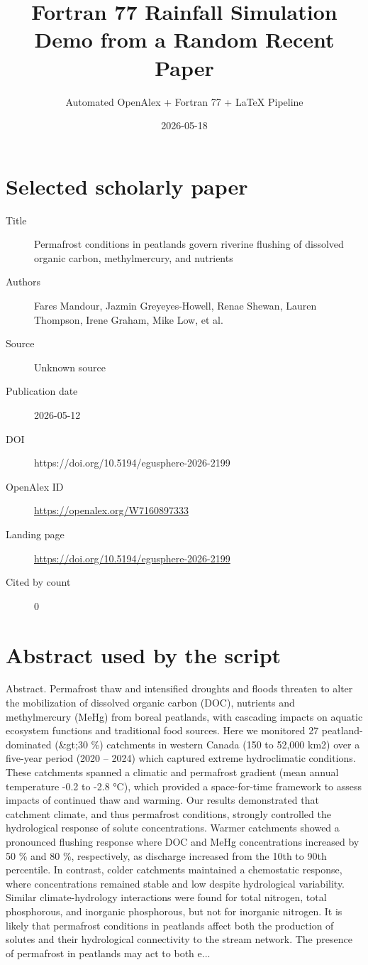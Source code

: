 \documentclass[11pt]{article}
\title{Fortran 77 Rainfall Simulation Demo from a Random Recent Paper}
\author{Automated OpenAlex + Fortran 77 + LaTeX Pipeline}
\date{2026-05-18}
\begin{document}
\maketitle

\section*{Selected scholarly paper}
\begin{description}
\item[Title] Permafrost conditions in peatlands govern riverine flushing of dissolved organic carbon, methylmercury, and nutrients
\item[Authors] Fares Mandour, Jazmin Greyeyes-Howell, Renae Shewan, Lauren Thompson, Irene Graham, Mike Low, et al.
\item[Source] Unknown source
\item[Publication date] 2026-05-12
\item[DOI] https://doi.org/10.5194/egusphere-2026-2199
\item[OpenAlex ID] \url{https://openalex.org/W7160897333}
\item[Landing page] \url{https://doi.org/10.5194/egusphere-2026-2199}
\item[Cited by count] 0
\end{description}

\section*{Abstract used by the script}
Abstract. Permafrost thaw and intensified droughts and floods threaten to alter the mobilization of dissolved organic carbon (DOC), nutrients and methylmercury (MeHg) from boreal peatlands, with cascading impacts on aquatic ecosystem functions and traditional food sources. Here we monitored 27 peatland-dominated (\&gt;30 \%) catchments in western Canada (150 to 52,000 km2) over a five-year period (2020 – 2024) which captured extreme hydroclimatic conditions. These catchments spanned a climatic and permafrost gradient (mean annual temperature -0.2 to -2.8 °C), which provided a space-for-time framework to assess impacts of continued thaw and warming. Our results demonstrated that catchment climate, and thus permafrost conditions, strongly controlled the hydrological response of solute concentrations. Warmer catchments showed a pronounced flushing response where DOC and MeHg concentrations increased by 50 \% and 80 \%, respectively, as discharge increased from the 10th to 90th percentile. In contrast, colder catchments maintained a chemostatic response, where concentrations remained stable and low despite hydrological variability. Similar climate-hydrology interactions were found for total nitrogen, total phosphorous, and inorganic phosphorous, but not for inorganic nitrogen. It is likely that permafrost conditions in peatlands affect both the production of solutes and their hydrological connectivity to the stream network. The presence of permafrost in peatlands may act to both e...
\end{document}
